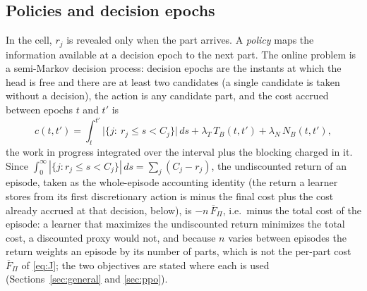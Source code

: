 \documentclass[11pt,a4paper]{article}
\theoremstyle{plain}
\theoremstyle{definition}
\theoremstyle{remark}
\newcommand{\Fpi}{\overline F_\Pi}
\begin{document}
\subsection{Policies and decision epochs}
In the cell, $r_j$ is revealed only when the part arrives. A \emph{policy} maps the
information available at a decision epoch to the next part. The online problem is a
semi-Markov decision process: decision epochs are the instants at which the head is free
and there are at least two candidates (a single candidate is taken without a decision),
the action is any candidate part, and the cost accrued between epochs $t$ and $t'$ is
\begin{equation}\label{eq:smdp}
c(t,t')=\int_t^{t'}\bigl|\{j:\ r_j\le s<C_j\}\bigr|\,ds+\lambda_T\,T_B(t,t')+\lambda_N\,N_B(t,t') ,
\end{equation}
the work in progress integrated over the interval plus the blocking charged in it. Since
$\int_0^\infty|\{j:r_j\le s<C_j\}|\,ds=\sum_j(C_j-r_j)$, the undiscounted return of an
episode, taken as the whole-episode accounting identity (the return a learner stores
from its first discretionary action is minus the final cost plus the cost already accrued
at that decision, below), is $-n\,\Fpi$, i.e.\ minus the total cost of the episode: a learner that
maximizes the undiscounted return minimizes the total cost, a discounted proxy would
not, and because $n$ varies between episodes the return weights an episode by its
number of parts, which is not the per-part cost $\Fpi$ of \eqref{eq:J}; the two
objectives are stated where each is used (Sections~\ref{sec:general} and
\ref{sec:ppo}).
\end{document}
